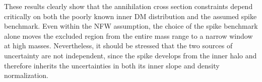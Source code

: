 These results clearly show that the annihilation cross section constraints 
depend critically on both the poorly known inner DM distribution and the assumed spike benchmark.
Even within the NFW assumption, the choice of the spike benchmark alone moves the
excluded region from the entire mass range to a narrow window at high masses.
Nevertheless, it should be stressed that the two sources of uncertainty 
are not independent, since the spike develops from the inner halo 
and therefore inherits the uncertainties in both its inner slope and density normalization.